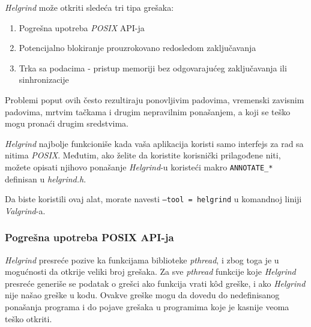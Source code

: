 \documentclass[12pt,oneside]{memoir}
\theoremstyle{plain}
\theoremstyle{definition}
\begin{document}
\textit{Helgrind} može otkriti sledeća tri tipa grešaka:
\begin{enumerate}
	\item Pogrešna upotreba \textit{POSIX} API-ja
	\item Potencijalno blokiranje prouzrokovano redosledom zaključavanja
	\item Trka sa podacima - pristup memoriji bez odgovarajućeg zaključavanja ili sinhronizacije
\end{enumerate}

Problemi poput ovih često rezultiraju ponovljivim padovima, vremenski zavisnim padovima, mrtvim tačkama i drugim nepravilnim ponašanjem, a koji se teško mogu pronaći drugim sredstvima.

\textit{Helgrind} najbolje funkcioniše kada vaša aplikacija koristi samo interfejs za rad sa nitima \textit{POSIX}. Međutim, ako želite da koristite korisnički prilagođene niti, možete opisati njihovo ponašanje \textit{Helgrind}-u koristeći makro \texttt{ANNOTATE\_*} definisan u \textit{helgrind.h}.

Da biste koristili ovaj alat, morate navesti \texttt{--tool = helgrind} u komandnoj liniji \textit{Valgrind}-a.

\subsubsection{Pogrešna upotreba POSIX API-ja}
\textit{Helgrind} presreće pozive ka funkcijama biblioteke \textit{pthread}, i zbog toga je u mogućnosti da otkrije veliki broj grešaka. Za sve \textit{pthread} funkcije koje \textit{Helgrind} presreće generiše se podatak o grešci ako funkcija vrati k\^od greške, i ako \textit{Helgrind} nije našao greške u kodu. Ovakve greške mogu da dovedu do nedefinisanog ponašanja programa i do pojave grešaka u programima koje je kasnije veoma teško otkriti.
\end{document}
